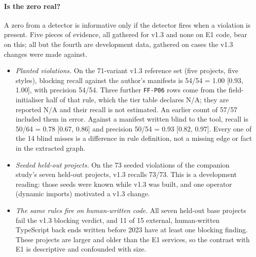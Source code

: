\documentclass[10pt,a4paper]{article}
\newcommand{\ff}[1]{\texttt{\small #1}}
\begin{document}
\paragraph{Is the zero real?} A zero from a detector is informative only if the detector fires when a violation is
present. Five pieces of evidence, all gathered for v1.3 and none on E1 code, bear on this; all but the fourth are
development data, gathered on cases the v1.3 changes were made against.
\begin{itemize}
  \item \emph{Planted violations.} On the 71-variant v1.3 reference set (five projects, five styles), blocking recall
        against the author's manifests is 54/54 = 1.00 [0.93, 1.00], with precision 54/54. Three further
        \ff{FF-P06} rows come from the field-initialiser half of that rule, which the tier table declares N/A; they
        are reported N/A and their recall is not estimated. An earlier count of 57/57 included them in error.
        Against a manifest written blind to the tool, recall is 50/64 = 0.78 [0.67, 0.86] and precision
        50/54 = 0.93 [0.82, 0.97]. Every one of the 14 blind misses is a difference in rule definition, not a
        missing edge or fact in the extracted graph.
  \item \emph{Seeded held-out projects.} On the 73 seeded violations of the companion study's seven held-out projects,
        v1.3 recalls 73/73. This is a development reading: those seeds were known while v1.3 was built, and one
        operator (dynamic imports) motivated a v1.3 change.
  \item \emph{The same rules fire on human-written code.} All seven held-out base projects fail the v1.3 blocking
        verdict, and 11 of 15 external, human-written TypeScript back ends written before 2023 have at least one
        blocking finding. These projects are larger and older than the E1 services, so the contrast with E1 is
        descriptive and confounded with size.

\end{itemize}
\end{document}
